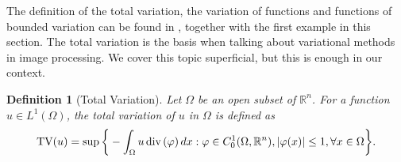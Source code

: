 \documentclass[abstracton]{scrreprt}
\newtheorem{definition}[theorem]{Definition}
\begin{document}
        The definition of the total variation, the variation of functions and functions of bounded variation can be found in \cite{Giusti}, together with the first example in this section. The total variation is the basis when talking about variational methods in image processing. We cover this topic superficial, but this is enough in our context.
        \begin{definition}[Total Variation] %
        \label{def:total_variation}
            Let $\Omega$ be an open subset of $\mathbb{R}^{n}$. For a function $u \in L^{1}(\Omega)$, the \textnormal{total variation} of $u$ in $\Omega$ is defined as
                $$
                    \textnormal{TV}(u) = \sup \bigg\{ -\int_{\Omega} u\, \textnormal{div}\, (\varphi)\, dx : \varphi \in C^{1}_{0}(\Omega, \mathbb{R}^{n}), |\varphi(x)| \le 1, \forall x \in \Omega \bigg\}.
                $$
        \end{definition}
\end{document}
